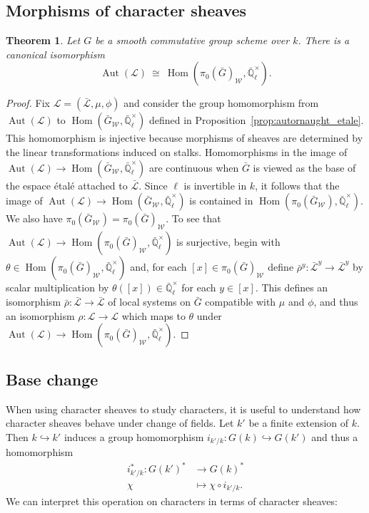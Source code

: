 \documentclass[10pt]{amsart}
\theoremstyle{plain}
\newtheorem{theorem}{Theorem}[section]
\theoremstyle{definition}
\theoremstyle{remark}
\newcommand{\EE}{\mathbb{\bar Q}_\ell}
\newcommand{\Fq}{k}
\newcommand{\EEx}{\EE^\times}
\newcommand{\Weil}[1]{\mathcal{W}_{#1}}
\DeclareMathOperator{\Aut}{Aut}
\DeclareMathOperator{\Hom}{Hom}
\newcommand{\iso}{{\ \cong\ }}
\newcommand{\cs}[1]{{\mathcal{#1}}}
\newcommand{\gcs}[1]{{\mathcal{\bar #1}}}
\newcommand{\bG}{\bar{G}}
\begin{document}
\subsection{Morphisms of character sheaves} \label{ssec:CSmor}

\begin{theorem}\label{thm:autornaught}
Let $G$ be a smooth commutative group scheme over $\Fq$.
There is a canonical isomorphism
\[
\Aut(\cs{L}) \iso \Hom(\pi_0(\bG)_{\Weil{}},\EEx).
\]
\end{theorem}
\begin{proof} 
Fix $\cs{L} = (\gcs{L},\mu,\phi)$ and consider the group homomorphism from $\Aut(\cs{L})$ to $\Hom(\bG_{\Weil{}},\EEx)$ defined in Proposition~\ref{prop:autornaught_etale}.
This homomorphism is injective because morphisms of sheaves are determined by the linear transformations induced on stalks.  
Homomorphisms in the image of $\Aut(\cs{L}) \to \Hom(\bG_{\Weil{}},\EEx)$ are continuous when $\bG$ is viewed as the base of the espace \'etal\'e attached to $\gcs{L}$.
Since $\ell$ is invertible in $\Fq$, it follows that the image of $\Aut(\cs{L}) \to \Hom(\bG_{\Weil{}},\EEx)$ is contained in $\Hom(\pi_0(\bG_{\Weil{}}),\EEx)$. 
We also have $\pi_0(\bG_{\Weil{}})=\pi_0(\bG)_{\Weil{}}$. 
To see that $\Aut(\cs{L}) \to \Hom(\pi_0(\bG)_{\Weil{}},\EEx)$ is surjective, begin with $\theta\in\Hom(\pi_0(\bG)_{\Weil{}},\EEx)$ and, for each $[x] \in \pi_0(\bG)_{\Weil{}}$ define $\bar\rho^y: \gcs{L}^y \to \gcs{L}^y$ by scalar multiplication by $\theta([x])\in \EEx$ for each $y\in [x]$.
This defines an isomorphism $\bar\rho : \gcs{L}\to \gcs{L}$ of local systems on $\bG$ compatible with $\mu$ and $\phi$, and thus an isomorphism $\rho :\cs{L}\to \cs{L}$ which maps to $\theta$ under $\Aut(\cs{L}) \to \Hom(\pi_0(\bG)_{\Weil{}},\EEx)$.
\end{proof}

\subsection{Base change}\label{ssec:basechange}

When using character sheaves to study characters, it is useful to understand
how character sheaves behave under change of fields.
Let $k'$ be a finite extension of $k$. Then $k \hookrightarrow k'$ induces a group homomorphism
$i_{k'/k} : G(k) \hookrightarrow G(k')$ and thus a homomorphism
\begin{align*}
i_{k'/k}^* : G(k')^* &\to G(k)^* \\
\chi &\mapsto \chi\circ i_{k'/k}.
\end{align*}
We can interpret this operation on characters in terms of character sheaves:
\end{document}
